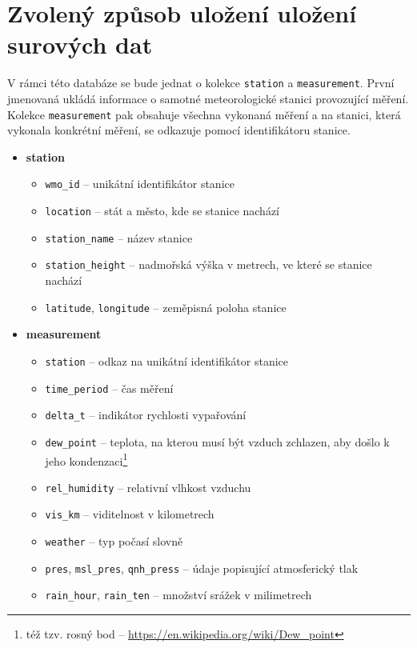 \documentclass[10pt,a4paper,titlepage]{extarticle}
\begin{document}
\section{Zvolený způsob uložení uložení surových dat}\label{sec:zvoleny-zpusob-ulozeni-surovych-dat}
V rámci této databáze se bude jednat o kolekce \texttt{station} a \texttt{measurement}. První jmenovaná ukládá
informace o samotné meteorologické stanici provozující měření.
Kolekce \texttt{measurement} pak obsahuje všechna vykonaná měření a na stanici,
která vykonala konkrétní měření, se odkazuje pomocí identifikátoru stanice.
\begin{itemize}
	\item \textbf{station}
	\begin{itemize}[label=\textperiodcentered]
    	\item \texttt{wmo\_id} -- unikátní identifikátor stanice
        \item \texttt{location} -- stát a město, kde se stanice nachází
        \item \texttt{station\_name} -- název stanice
        \item \texttt{station\_height} -- nadmořská výška v metrech, ve které se stanice nachází
        \item \texttt{latitude}, \texttt{longitude} -- zeměpisná poloha stanice
    \end{itemize}
	\item \textbf{measurement}
	\begin{itemize}[label=\textperiodcentered]
        \item \texttt{station} -- odkaz na unikátní identifikátor stanice
        \item \texttt{time\_period} -- čas měření
        \item \texttt{delta\_t} -- indikátor rychlosti vypařování
        \item \texttt{dew\_point} -- teplota, na kterou musí být vzduch zchlazen, aby došlo k jeho
        kondenzaci\footnote{též tzv. rosný bod -- \url{https://en.wikipedia.org/wiki/Dew\_point}}
        \item \texttt{rel\_humidity} -- relativní vlhkost vzduchu
        \item \texttt{vis\_km} -- viditelnost v kilometrech
        \item \texttt{weather} -- typ počasí slovně
        \item \texttt{pres}, \texttt{msl\_pres}, \texttt{qnh\_press} -- údaje popisující atmosferický tlak
        \item \texttt{rain\_hour}, \texttt{rain\_ten} -- množství srážek v milimetrech

\end{itemize}
\end{itemize}
\end{document}
